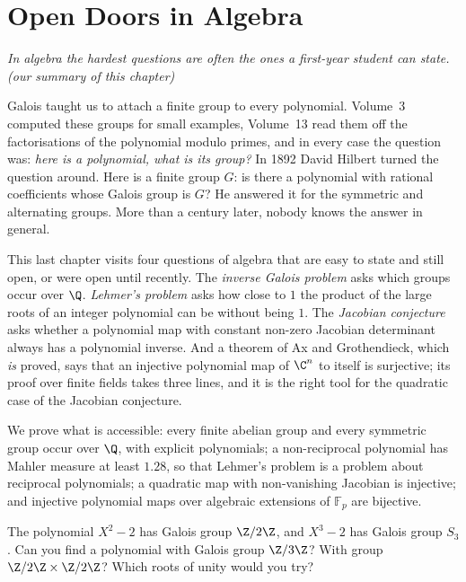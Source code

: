 \chapter{Open Doors in Algebra}\label{conjectures:ch:algebra}

\begin{center}\itshape
In algebra the hardest questions are often the ones a first-year student can state.\\
\upshape(our summary of this chapter)
\end{center}

Galois taught us to attach a finite group to every polynomial. Volume~3 computed these groups for small examples, Volume~13 read them off the
factorisations of the polynomial modulo primes, and in every case the question was: \emph{here is a polynomial, what is its group?} In 1892 David Hilbert
turned the question around. Here is a finite group $G$: is there a polynomial with rational coefficients whose Galois group is $G$? He answered it for the
symmetric and alternating groups. More than a century later, nobody knows the answer in general.

This last chapter visits four questions of algebra that are easy to state and still open, or were open until recently. The \emph{inverse Galois problem}
asks which groups occur over $\Q$. \emph{Lehmer's problem} asks how close to $1$ the product of the large roots of an integer polynomial can be without being
$1$. The \emph{Jacobian conjecture} asks whether a polynomial map with constant non-zero Jacobian determinant always has a polynomial inverse. And a
theorem of Ax and Grothendieck, which \emph{is} proved, says that an injective polynomial map of $\C^n$ to itself is surjective; its proof over finite
fields takes three lines, and it is the right tool for the quadratic case of the Jacobian conjecture.

We prove what is accessible: every finite abelian group and every symmetric group occur over $\Q$, with explicit polynomials; a non-reciprocal polynomial
has Mahler measure at least $1.28$, so that Lehmer's problem is a problem about reciprocal polynomials; a quadratic map with non-vanishing Jacobian is
injective; and injective polynomial maps over algebraic extensions of $\mathbb F_p$ are bijective.

\begin{think}
The polynomial $X^2-2$ has Galois group $\Z/2\Z$, and $X^3-2$ has Galois group $S_3$. Can you find a polynomial with Galois group $\Z/3\Z$? With group
$\Z/2\Z\times\Z/2\Z$? Which roots of unity would you try?
\end{think}


